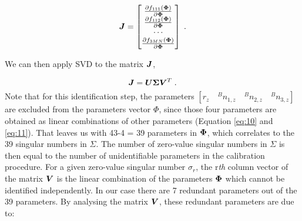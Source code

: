 \renewcommand\arraystretch{1.5}
\begin{equation}
\vb*{J} = \begin{bmatrix}
 \frac{\partial f_{111}(\vb*{\Phi})}{\partial\vb*{\Phi}}\\
 \frac{\partial f_{112}(\vb*{\Phi})}{\partial\vb*{\Phi}}\\
 \cdots \\
 \frac{\partial f_{3MN}(\vb*{\Phi})}{\partial\vb*{\Phi}}\\
	\end{bmatrix} \; .
\end{equation}

We can then apply SVD to the matrix $\vb*{J}$,

\begin{equation}
 \vb*{J} = \vb*{U}\vb*{\Sigma}\vb*{V}^T \; .
\end{equation}
Note that for this identification step, the parameters $[r_z \quad {^B}n_{1,z}\quad {^B}n_{2,z}\quad {^B}n_{3,z}]$ are excluded from the parameters vector $\Phi$, since those four parameters are obtained as linear combinations of other parameters (Equation \eqref{eq:10} and \eqref{eq:11}). That leaves us with 43-4 = 39 parameters in $\vb*{\Phi}$, which correlates to the 39 singular numbers in $\Sigma$. The number of zero-value singular numbers in $\Sigma$ is then equal to the number of unidentifiable parameters in the calibration procedure. For a given zero-value singular number $\sigma_r$, the r\textit{th} column vector of the matrix $\vb*{V}$ is the linear combination of the parameters $\vb*{\Phi}$ which cannot be identified independently. 
In our case there are 7 redundant parameters out of the 39 parameters. By analysing the matrix $\vb*{V}$, these redundant parameters are due to:
